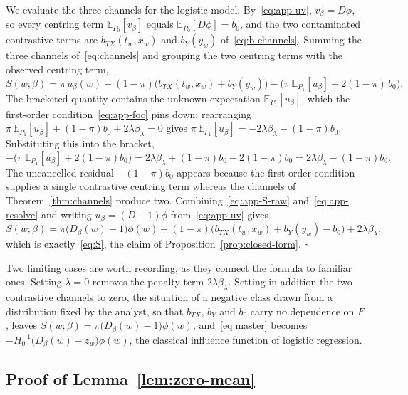 \documentclass[11pt]{article}
\theoremstyle{plain}
\theoremstyle{definition}
\theoremstyle{remark}
\newcommand{\pE}{\ensuremath{\mathbb{E}}}
\newcommand{\ratio}{\ensuremath{\pi}}
\newcommand{\score}{S}
\begin{document}
We evaluate the three channels for the logistic model. By~\eqref{eq:app-uv}, $v_\beta = D\phi$,
so every centring term $\pE_{P_0}[v_\beta]$ equals $\pE_{P_0}[D\phi] = b_0$, and the two
contaminated contrastive terms are $b_{TX}(t_w,x_w)$ and $b_Y(y_w)$ of~\eqref{eq:b-channels}.
Summing the three channels of~\eqref{eq:channels} and grouping the two centring terms with the
observed centring term,
\begin{equation}
\score(w;\beta)
= \ratio\,u_\beta(w) + (1-\ratio)\big( b_{TX}(t_w,x_w) + b_Y(y_w) \big)
- \Big( \ratio\,\pE_{P_1}[u_\beta] + 2(1-\ratio)\,b_0 \Big).
\label{eq:app-S-raw}
\end{equation}
The bracketed quantity contains the unknown expectation $\pE_{P_1}[u_\beta]$, which the
first-order condition~\eqref{eq:app-foc} pins down: rearranging
$\ratio\,\pE_{P_1}[u_\beta] + (1-\ratio)b_0 + 2\lambda\beta_\lambda = 0$ gives
$\ratio\,\pE_{P_1}[u_\beta] = -2\lambda\beta_\lambda - (1-\ratio)b_0$. Substituting this into the
bracket,
\begin{equation}
-\Big( \ratio\,\pE_{P_1}[u_\beta] + 2(1-\ratio)b_0 \Big)
= 2\lambda\beta_\lambda + (1-\ratio)b_0 - 2(1-\ratio)b_0
= 2\lambda\beta_\lambda - (1-\ratio)b_0 .
\label{eq:app-resolve}
\end{equation}
The uncancelled residual $-(1-\ratio)b_0$ appears because the first-order condition supplies a
single contrastive centring term whereas the channels of Theorem~\ref{thm:channels} produce
two. Combining~\eqref{eq:app-S-raw} and~\eqref{eq:app-resolve} and writing
$u_\beta = (D-1)\phi$ from~\eqref{eq:app-uv} gives
\[
\score(w;\beta)
= \ratio\big(D_\beta(w)-1\big)\phi(w)
+ (1-\ratio)\big(b_{TX}(t_w,x_w) + b_Y(y_w) - b_0\big)
+ 2\lambda\beta_\lambda,
\]
which is exactly~\eqref{eq:S}, the claim of Proposition~\ref{prop:closed-form}. \hfill$\square$

Two limiting cases are worth recording, as they connect the formula to familiar ones. Setting
$\lambda = 0$ removes the penalty term $2\lambda\beta_\lambda$. Setting in addition the two
contrastive channels to zero, the situation of a negative class drawn from a distribution
fixed by the analyst, so that $b_{TX}$, $b_Y$ and $b_0$ carry no dependence on $F$, leaves
$\score(w;\beta) = \ratio\big(D_\beta(w)-1\big)\phi(w)$, and~\eqref{eq:master} becomes
$-H_0^{-1}\big(D_\beta(w) - z_w\big)\phi(w)$, the classical influence function of logistic
regression.

\subsection{Proof of Lemma~\ref{lem:zero-mean}}
\label{app:logistic-zero-mean}
\end{document}
